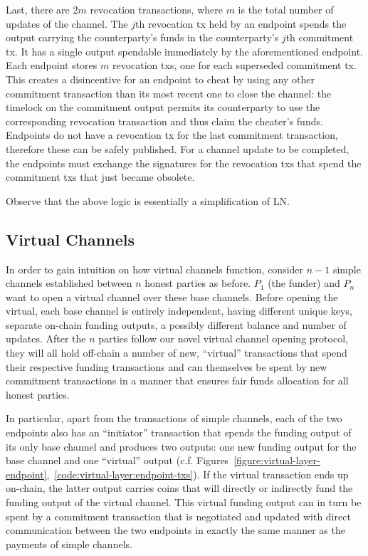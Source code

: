   Last, there are $2m$ revocation transactions, where $m$ is the total number of
  updates of the channel. The $j$th revocation tx held by an endpoint spends the
  output carrying the counterparty's funds in the counterparty's $j$th
  commitment tx. It has a single output spendable immediately by the
  aforementioned endpoint. Each endpoint stores $m$ revocation txs, one for each
  superseded commitment tx. This creates a disincentive for an endpoint to cheat
  by using any other commitment transaction than its most recent one to close
  the channel: the timelock on the commitment output permits its counterparty to
  use the corresponding revocation transaction and thus claim the cheater's
  funds.  Endpoints do not have a revocation tx for the last commitment
  transaction, therefore these can be safely published. For a channel update to
  be completed, the endpoints must exchange the signatures for the revocation
  txs that spend the commitment txs that just became obsolete.

  Observe that the above logic is essentially a simplification of LN.

\subsection{Virtual Channels}
  In order to gain intuition on how virtual channels function, consider $n-1$
  simple channels established between $n$ honest parties as before. $P_1$ (the
  funder) and $P_n$ want to open a virtual channel over these base channels.
  Before opening the virtual, each base channel is entirely independent, having
  different unique keys, separate on-chain funding outputs, a possibly different
  balance and number of updates. After the $n$ parties follow our novel virtual
  channel opening protocol, they will all hold off-chain a number of new,
  ``virtual'' transactions that spend their respective funding transactions and
  can themselves be spent by new commitment transactions in a manner that
  ensures fair funds allocation for all honest parties.

  In particular, apart from the transactions of simple channels, each of the two
  endpoints also has an ``initiator'' transaction that spends the funding output
  of its only base channel and produces two outputs: one new funding output for
  the base channel and one ``virtual'' output (c.f.
  Figures~\ref{figure:virtual-layer-endpoint},~\ref{code:virtual-layer:endpoint-txs}).
  If the
  virtual  transaction ends up on-chain, the latter output carries coins that
  will directly or indirectly fund the funding output of the virtual channel.
   
  This virtual funding output can in turn be spent by a commitment transaction
  that is negotiated and updated with direct communication between the two
  endpoints in exactly the same manner as the payments of simple channels.

